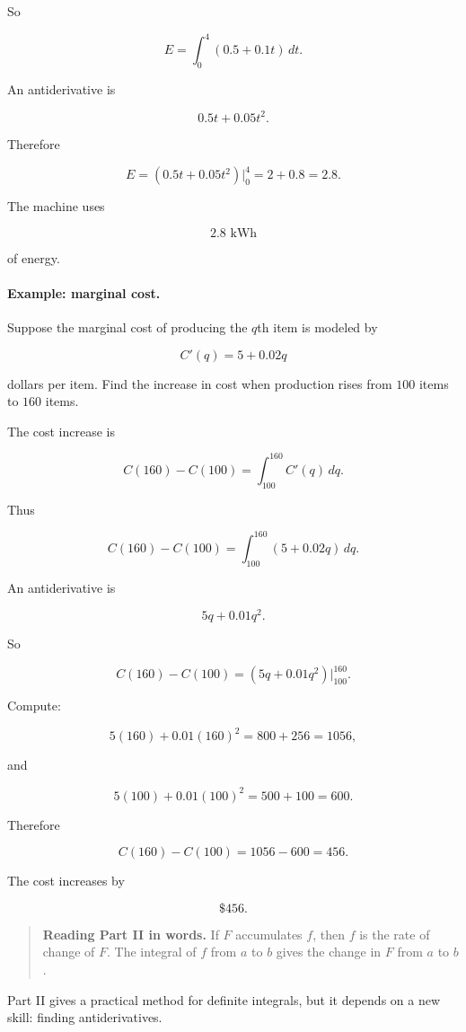 So

\[
E=\int_0^4 (0.5+0.1t)\,dt.
\]

An antiderivative is

\[
0.5t+0.05t^2.
\]

Therefore

\[
E=
(0.5t+0.05t^2)\Big|_0^4
=
2+0.8
=
2.8.
\]

The machine uses

\[
\boxed{2.8\text{ kWh}}
\]

of energy.

\paragraph{Example: marginal cost.}
Suppose the marginal cost of producing the \(q\)th item is modeled by

\[
C'(q)=5+0.02q
\]

dollars per item.  Find the increase in cost when production rises from \(100\) items
to \(160\) items.

The cost increase is

\[
C(160)-C(100)=\int_{100}^{160} C'(q)\,dq.
\]

Thus

\[
C(160)-C(100)
=
\int_{100}^{160} (5+0.02q)\,dq.
\]

An antiderivative is

\[
5q+0.01q^2.
\]

So

\[
C(160)-C(100)
=
(5q+0.01q^2)\Big|_{100}^{160}.
\]

Compute:

\[
5(160)+0.01(160)^2=800+256=1056,
\]

and

\[
5(100)+0.01(100)^2=500+100=600.
\]

Therefore

\[
C(160)-C(100)=1056-600=456.
\]

The cost increases by

\[
\boxed{\$456.}
\]

\begin{quote}
\textbf{Reading Part II in words.}
If \(F\) accumulates \(f\), then \(f\) is the rate of change of \(F\).  The integral of \(f\)
from \(a\) to \(b\) gives the change in \(F\) from \(a\) to \(b\).
\end{quote}

Part II gives a practical method for definite integrals, but it depends on a new skill:
finding antiderivatives.

